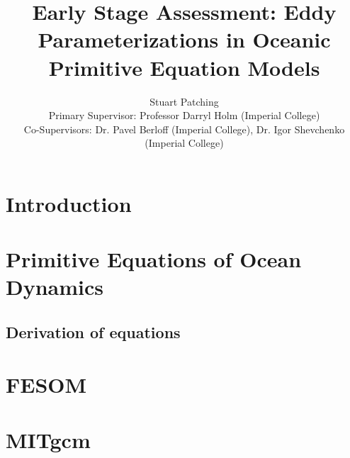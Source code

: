 \documentclass[10pt]{article}
\begin{document}
\title{\vspace{-4.0em}Early Stage Assessment: Eddy Parameterizations in Oceanic Primitive Equation Models}
\date{\vspace{-0.5em}}
\author{Stuart Patching \\
\small{Primary Supervisor: Professor Darryl Holm (Imperial College)}\\
\small{Co-Supervisors: Dr. Pavel Berloff (Imperial College), Dr. Igor Shevchenko (Imperial College)} \vspace{-2em}}
\maketitle

\section{Introduction}
	


\section{Primitive Equations of Ocean Dynamics}	
	\subsection{Derivation of equations}
		

\section{FESOM}
	

\section{MITgcm}
	

\newpage


\end{document}
